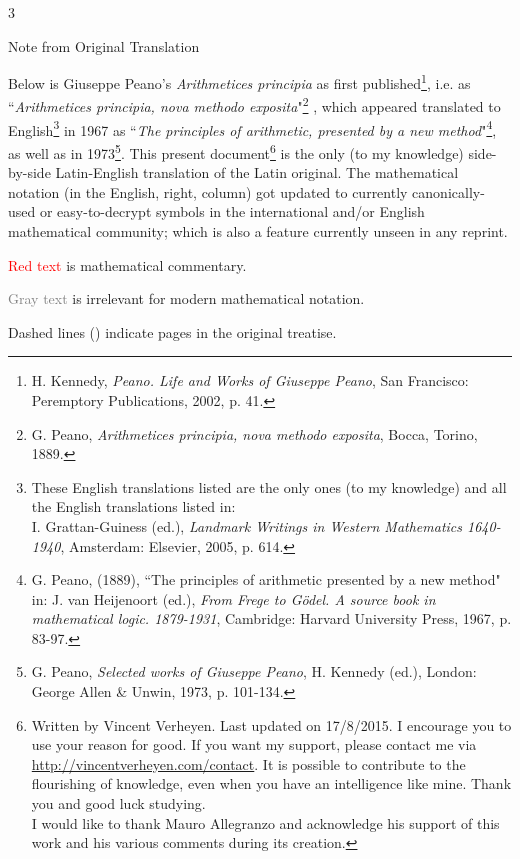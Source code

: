 \documentclass{book}
\newcommand\irrelevant[1]{\textcolor{gray}{#1}}
\begin{document}
\newpage  


%
\begin{paracol}{3}
  \switchcolumn[1] %

  { \Large Note from Original Translation}

   \vspace{0.25cm}
  
   Below is Giuseppe Peano's \emph{Arithmetices principia} as first published\footnote{H. Kennedy, \emph{Peano. Life and Works of Giuseppe Peano}, San Francisco: Peremptory Publications, 2002, p. 41.}, i.e. as ``\emph{Arithmetices principia, nova methodo exposita}"\footnote{G. Peano, \emph{Arithmetices principia, nova methodo exposita}, Bocca, Torino, 1889.} , which appeared translated to English\footnote{These English translations listed are the only ones (to my knowledge) and all the English translations listed in: \\
   I. Grattan-Guiness (ed.), \emph{Landmark Writings in Western Mathematics 1640-1940}, Amsterdam: Elsevier, 2005, p. 614.} in 1967 as ``\emph{The principles of arithmetic, presented by a new method}"\footnote{G. Peano, (1889), ``The principles of arithmetic presented by a new method" in: J. van Heijenoort (ed.), \emph{From Frege to G\"odel. A source book in mathematical logic. 1879-1931}, Cambridge: Harvard University Press, 1967, p. 83-97.}, as well as in 1973\footnote{G. Peano, \emph{Selected works of Giuseppe Peano}, H. Kennedy (ed.), London: George Allen \& Unwin, 1973, p. 101-134.}.
   This present document\footnote{Written by Vincent Verheyen. Last updated on 17/8/2015. I encourage you to use your reason for good. If you want my support, please contact me via \url{http://vincentverheyen.com/contact}. It is possible to contribute to the flourishing of knowledge, even when you have an intelligence like mine. Thank you and good luck studying. \\
   I would like to thank Mauro Allegranzo and acknowledge his support of this work and his various comments during its creation.} is the only (to my knowledge) side-by-side Latin-English translation of the Latin original.
   The mathematical notation (in the English, right, column) got updated to currently canonically-used or easy-to-decrypt symbols in the international and/or English mathematical community; which is also a feature currently unseen in any reprint.

   \vspace{1cm}
   
   \textcolor{red}{Red text} is mathematical commentary.

   \irrelevant{Gray text} is irrelevant for modern mathematical notation.

   Dashed lines (\hdashrule{2cm}{0.1mm}{0.1mm 1mm}) indicate pages in the original treatise.

   \vspace{1cm}
\end{paracol}
\newpage  
\end{document}
